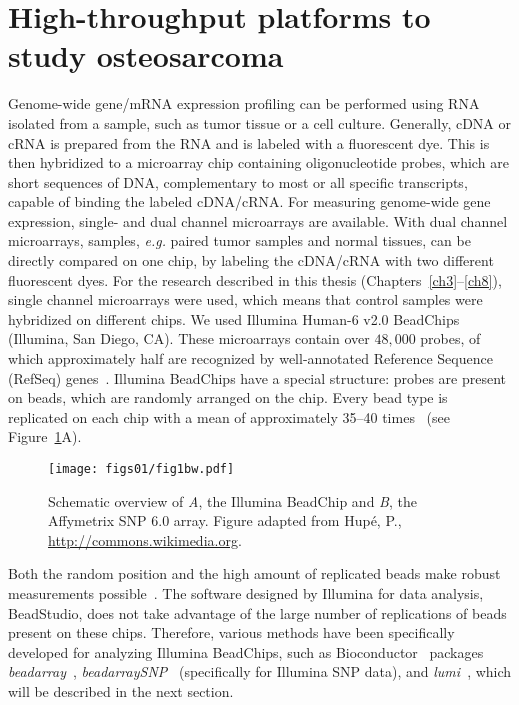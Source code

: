 \section{High\hyp{}throughput platforms to study osteosarcoma}\label{platforms1}
Genome\hyp{}wide gene/mRNA expression profiling can be performed using RNA isolated from a sample, such as tumor tissue or a cell culture. Generally, cDNA or cRNA is prepared from the RNA and is labeled with a fluorescent dye. This is then hybridized to a microarray chip containing oligonucleotide probes, which are short sequences of DNA, complementary to most or all specific transcripts, capable of binding the labeled cDNA/cRNA. For measuring genome\hyp{}wide gene expression, single- and dual channel microarrays are available. With dual channel microarrays, samples, {\it e.g.} paired tumor samples and normal tissues, can be directly compared on one chip, by labeling the cDNA/cRNA with two different fluorescent dyes. For the research described in this thesis (Chapters~\ref{ch3}--\ref{ch8}), single channel microarrays were used, which means that control samples were hybridized on different chips. We used Illumina Human-6 v2.0 BeadChips (Illumina, San Diego, CA). These microarrays contain over $48,000$ probes, of which approximately half are recognized by well\hyp{}annotated Reference Sequence (RefSeq) genes~\cite{pruitt2002reference}. Illumina BeadChips have a special structure: probes are present on beads, which are randomly arranged on the chip. Every bead type is replicated on each chip with a mean of approximately 35--40 times~\cite{oliphant2002beadarray,barbosa2010re} (see Figure~\ref{fig1.1}A).
%
\begin{figure}[htbp]
	\centering
	\texttt{[image: figs01/fig1bw.pdf]}	%
	\caption{Schematic overview of {\it A}, the Illumina BeadChip and {\it B}, the Affymetrix SNP 6.0 array. Figure adapted from Hup\'e, P., \url{http://commons.wikimedia.org}.}
	\label{fig1.1}
\end{figure}
%
Both the random position and the high amount of replicated beads make robust measurements possible~\cite{dunning2007beadarray}. The software designed by Illumina for data analysis, BeadStudio, does not take advantage of the large number of replications of beads present on these chips. Therefore, various methods have been specifically developed for analyzing Illumina BeadChips, such as Bioconductor~\cite{gentleman2004bioconductor} packages {\it beadarray}~\cite{dunning2007beadarray}, {\it beadarraySNP}~\cite{oosting2010beadarraysnp} (specifically for Illumina SNP data), and {\it lumi}~\cite{du2008lumi}, which will be described in the next section.

